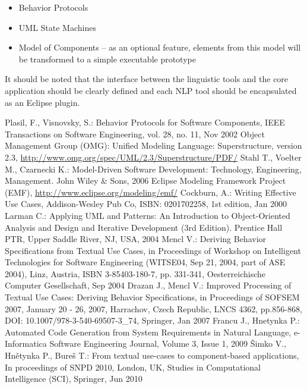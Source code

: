 \documentclass[12pt,a4paper]{article}
\begin{document}
\begin{itemize}
\item Behavior Protocols \cite{BP}
\item UML State Machines \cite{UML}
\item Model of Components \cite{CMM} -- as an optional feature, elements from this model will be transformed to a simple executable prototype
\end{itemize}
It should be noted that the interface between the linguistic tools and the core application should be clearly defined and each NLP tool should be encapsulated as an Eclipse plugin.

\begin{thebibliography}{99}
Plasil, F., Visnovsky, S.: Behavior Protocols for Software Components, IEEE Transactions on Software Engineering, vol. 28, no. 11, Nov 2002
Object Management Group (OMG): Unified Modeling Language: Superstructure, version 2.3, \url{http://www.omg.org/spec/UML/2.3/Superstructure/PDF/}
Stahl T., Voelter M., Czarnecki K.: Model-Driven Software Development: Technology, Engineering, Management. John Wiley \& Sons, 2006
 Eclipse Modeling Framework Project (EMF), \url{http://www.eclipse.org/modeling/emf/}
 Cockburn, A.: Writing Effective Use Cases, Addison-Wesley Pub Co, ISBN: 0201702258, 1st edition, Jan 2000
 Larman C.: Applying UML and Patterns: An Introduction to Object-Oriented Analysis and Design and Iterative Development (3rd Edition). Prentice Hall PTR, Upper Saddle River, NJ, USA, 2004
 Mencl V.: Deriving Behavior Specifications from Textual Use Cases, in Proceedings of Workshop on Intelligent Technologies for Software Engineering (WITSE04, Sep 21, 2004, part of ASE 2004), Linz, Austria, ISBN 3-85403-180-7, pp. 331-341, Oesterreichische Computer Gesellschaft, Sep 2004
 Drazan J., Mencl V.: Improved Processing of Textual Use Cases: Deriving Behavior Specifications, in Proceedings of SOFSEM 2007, January 20 - 26, 2007, Harrachov, Czech Republic, LNCS 4362, pp.856-868, DOI: 10.1007/978-3-540-69507-3\_74, Springer, Jan 2007
 Francu J., Hnetynka P.: Automated Code Generation from System Requirements in Natural Language, e-Informatica Software Engineering Journal, Volume 3, Issue 1, 2009
 Šimko V., Hnětynka P., Bureš T.: From textual use-cases to component-based applications, In proceedings of SNPD 2010, London, UK, Studies in Computational Intelligence (SCI), Springer, Jun 2010

\end{thebibliography}
\end{document}
